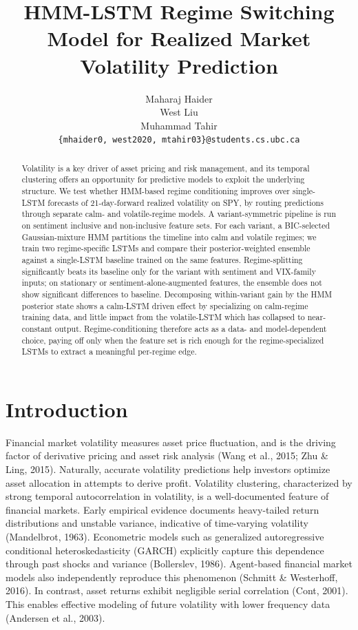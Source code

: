 \documentclass{article}
\title{HMM-LSTM Regime Switching Model for Realized Market Volatility Prediction}
\author{%
  Maharaj Haider\\
  \And
  West Liu\\
  \And
  Muhammad Tahir\\
  \And
    \texttt{\{mhaider0, west2020, mtahir03\}@students.cs.ubc.ca}\\
}
\begin{document}
\maketitle


\begin{abstract}
Volatility is a key driver of asset pricing and risk management, and its temporal clustering offers an opportunity for predictive models to exploit the      
  underlying structure. We test whether HMM-based regime conditioning improves over single-LSTM forecasts of 21-day-forward realized volatility on SPY, by routing predictions through      
  separate calm- and volatile-regime models. A variant-symmetric pipeline is run on sentiment inclusive and non-inclusive feature sets. For each variant, a BIC-selected       
  Gaussian-mixture HMM partitions the timeline into calm and volatile regimes; we train two regime-specific LSTMs and compare their posterior-weighted        
  ensemble against a single-LSTM baseline trained on the same features. Regime-splitting significantly beats its baseline only for the variant with sentiment and VIX-family
  inputs; on stationary or sentiment-alone-augmented features, the ensemble does not show significant differences to baseline. Decomposing within-variant gain by the HMM
  posterior state shows a calm-LSTM driven effect by specializing on calm-regime training data, and little impact from the volatile-LSTM which has collapsed to near-constant output. Regime-conditioning therefore acts as a data- and model-dependent choice, paying off only when the feature set is rich enough for the regime-specialized LSTMs to extract a meaningful per-regime edge.
\end{abstract}
\section{Introduction}

Financial market volatility measures asset price fluctuation, and is the driving factor of derivative pricing and asset risk analysis (Wang et al., 2015; Zhu \& Ling, 2015). Naturally, accurate volatility predictions help investors optimize asset allocation in attempts to derive profit. Volatility clustering, characterized by strong temporal autocorrelation in volatility, is a well-documented feature of financial markets. Early empirical evidence documents heavy-tailed return distributions and unstable variance, indicative of time-varying volatility (Mandelbrot, 1963). Econometric models such as generalized autoregressive conditional heteroskedasticity (GARCH) explicitly capture this dependence through past shocks and variance (Bollerslev, 1986). Agent-based financial market models also independently reproduce this phenomenon (Schmitt \& Westerhoff, 2016). In contrast, asset returns exhibit negligible serial correlation (Cont, 2001). This enables effective modeling of future volatility with lower frequency data (Andersen et al., 2003). 
\end{document}
